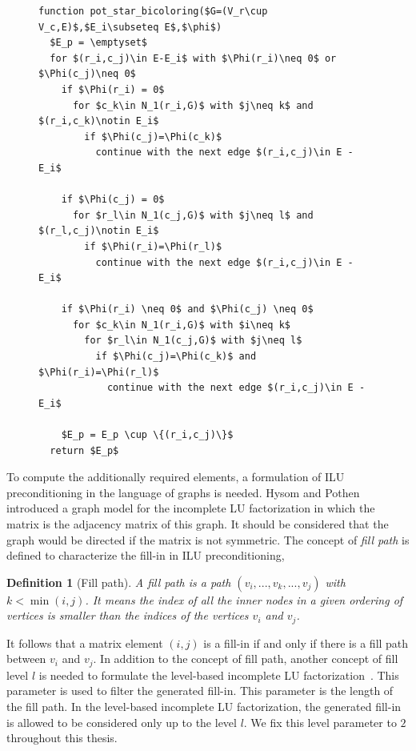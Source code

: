 \documentclass[12pt, twoside,a4paper,toc=bibliography]{scrbook}
\newtheorem{definition}{Definition}
\begin{document}
\begin{figure}
\begin{lstlisting}[caption=Find potentially required elements for star bicoloring (based on Algorithm 4.3 from ~\cite{Lulfesmann2012Fap}).,label=code.pot.sb,mathescape]
function pot_star_bicoloring($G=(V_r\cup V_c,E)$,$E_i\subseteq E$,$\phi$)
  $E_p = \emptyset$
  for $(r_i,c_j)\in E-E_i$ with $\Phi(r_i)\neq 0$ or $\Phi(c_j)\neq 0$
    if $\Phi(r_i) = 0$
      for $c_k\in N_1(r_i,G)$ with $j\neq k$ and $(r_i,c_k)\notin E_i$
        if $\Phi(c_j)=\Phi(c_k)$
          continue with the next edge $(r_i,c_j)\in E - E_i$

    if $\Phi(c_j) = 0$
      for $r_l\in N_1(c_j,G)$ with $j\neq l$ and $(r_l,c_j)\notin E_i$
        if $\Phi(r_i)=\Phi(r_l)$
          continue with the next edge $(r_i,c_j)\in E - E_i$

    if $\Phi(r_i) \neq 0$ and $\Phi(c_j) \neq 0$
      for $c_k\in N_1(r_i,G)$ with $i\neq k$
        for $r_l\in N_1(c_j,G)$ with $j\neq l$
          if $\Phi(c_j)=\Phi(c_k)$ and $\Phi(r_i)=\Phi(r_l)$
            continue with the next edge $(r_i,c_j)\in E - E_i$

    $E_p = E_p \cup \{(r_i,c_j)\}$
  return $E_p$
\end{lstlisting}
\end{figure}

To compute the additionally required elements, a formulation of ILU preconditioning
in the language of graphs is needed.
Hysom and Pothen~\cite{precond-pothen} introduced a graph model for the incomplete
LU factorization in which the matrix is the adjacency matrix of this graph.
It should be considered that the graph would be directed if the matrix is not symmetric.
The concept of \textit{fill path} is defined to characterize the fill-in in ILU preconditioning,
\begin{definition}[Fill path]\label{d.fill.path}
A fill path is a path $(v_i,...,v_k,...,v_j)$ with
$k<\min(i,j)$. It means the index of all the inner nodes in a given ordering of vertices
is smaller than the indices of the vertices $v_i$ and $v_j$.
\end{definition}
It follows that a matrix element $(i,j)$ is a fill-in if and only if there is a fill path between
$v_i$ and $v_j$.
In addition to the concept of fill path, another concept of fill level $l$ is needed to
formulate the level-based incomplete LU factorization~\cite{precond-pothen}.
This parameter is used to filter the generated fill-in.
This parameter is the length of the fill path.
In the level-based incomplete LU factorization, the generated fill-in is allowed
to be considered only up to the level $l$.
We fix this level parameter to $2$ throughout this thesis.
\end{document}
